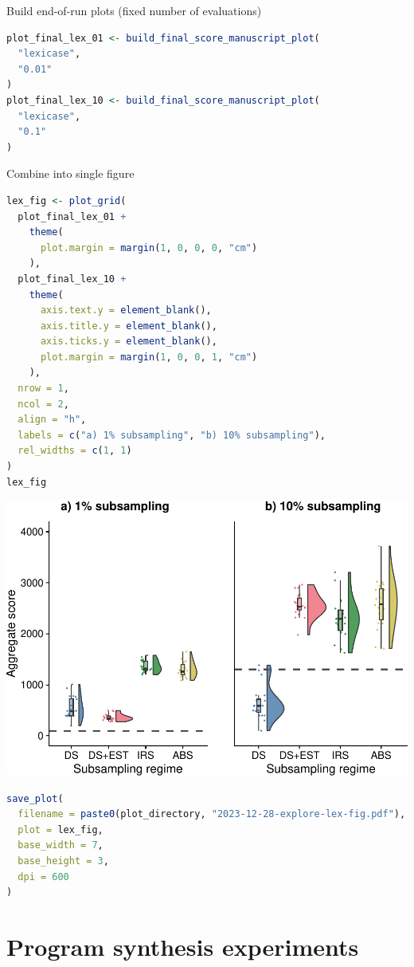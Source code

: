 \documentclass[
]{book}
\begin{document}
Build end-of-run plots (fixed number of evaluations)

\begin{lstlisting}[language=R]
plot_final_lex_01 <- build_final_score_manuscript_plot(
  "lexicase",
  "0.01"
)
plot_final_lex_10 <- build_final_score_manuscript_plot(
  "lexicase",
  "0.1"
)
\end{lstlisting}

Combine into single figure

\begin{lstlisting}[language=R]
lex_fig <- plot_grid(
  plot_final_lex_01 +
    theme(
      plot.margin = margin(1, 0, 0, 0, "cm")
    ),
  plot_final_lex_10 +
    theme(
      axis.text.y = element_blank(),
      axis.title.y = element_blank(),
      axis.ticks.y = element_blank(),
      plot.margin = margin(1, 0, 0, 1, "cm")
    ),
  nrow = 1,
  ncol = 2,
  align = "h",
  labels = c("a) 1% subsampling", "b) 10% subsampling"),
  rel_widths = c(1, 1)
)
lex_fig
\end{lstlisting}

\includegraphics{phylogeny-informed-subsampling-supplemental_files/figure-latex/unnamed-chunk-64-1.pdf}

\begin{lstlisting}[language=R]
save_plot(
  filename = paste0(plot_directory, "2023-12-28-explore-lex-fig.pdf"),
  plot = lex_fig,
  base_width = 7,
  base_height = 3,
  dpi = 600
)
\end{lstlisting}

\hypertarget{program-synthesis-experiments}{%
\chapter{Program synthesis experiments}\label{program-synthesis-experiments}}
\end{document}

